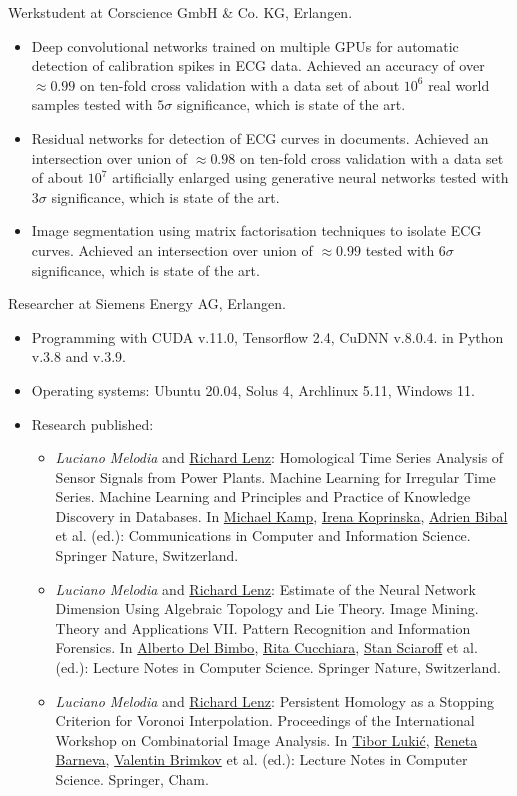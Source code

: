 \documentclass[a4paper, 11pt]{article}
\newcommand{\years}[1]{\marginnote{\scriptsize #1}}
\begin{document}
	\years{2021--22} Werkstudent at Corscience GmbH \& Co. KG, Erlangen.
	\begin{itemize}
		\item Deep convolutional networks trained on multiple GPUs for automatic detection of calibration spikes in ECG data. Achieved an accuracy of over $\approx 0.99$ on ten-fold cross validation with a data set of about $10^6$ real world samples tested with $5 \sigma$ significance, which is state of the art.

		\item Residual networks for detection of ECG curves in documents. Achieved an intersection over union of $\approx 0.98$ on ten-fold cross validation with a data set of about $10^7$ artificially enlarged using generative neural networks tested with $3\sigma$ significance, which is state of the art.

		\item Image segmentation using matrix factorisation techniques to isolate ECG curves. Achieved an intersection over union of $\approx 0.99$ tested with $6 \sigma$ significance, which is state of the art.
	\end{itemize}
	\years{2019--21} Researcher at Siemens Energy AG, Erlangen.
	\begin{itemize}
		\item Programming with CUDA v.11.0, Tensorflow 2.4, CuDNN v.8.0.4. in Python v.3.8 and v.3.9.

		\item Operating systems: Ubuntu 20.04, Solus 4, Archlinux 5.11, Windows 11. 

		\item Research published:
		\begin{itemize}
			\item \emph{Luciano Melodia} and \ul{Richard Lenz}: Homological Time Series Analysis of Sensor Signals from Power Plants. Machine Learning for Irregular Time Series. Machine Learning and Principles and Practice of Knowledge Discovery in Databases. In \ul{Michael Kamp}, \ul{Irena Koprinska}, \ul{Adrien Bibal} et al. (ed.): Communications in Computer and Information Science. Springer Nature, Switzerland.
			\item \emph{Luciano Melodia} and \ul{Richard Lenz}: Estimate of the Neural Network Dimension Using Algebraic Topology and Lie Theory. Image Mining. Theory and Applications VII. Pattern Recognition and Information Forensics. In \ul{Alberto Del Bimbo}, \ul{Rita Cucchiara}, \ul{Stan Sciaroff} et al. (ed.): Lecture Notes in Computer Science. Springer Nature, Switzerland.
			\item \emph{Luciano Melodia} and \ul{Richard Lenz}: Persistent Homology as a Stopping Criterion for Voronoi Interpolation. Proceedings of the International Workshop on Combinatorial Image Analysis. In \ul{Tibor Lukić}, \ul{Reneta Barneva}, \ul{Valentin Brimkov} et al. (ed.): Lecture Notes in Computer Science. Springer, Cham.
		\end{itemize}
	\end{itemize}
\end{document}

